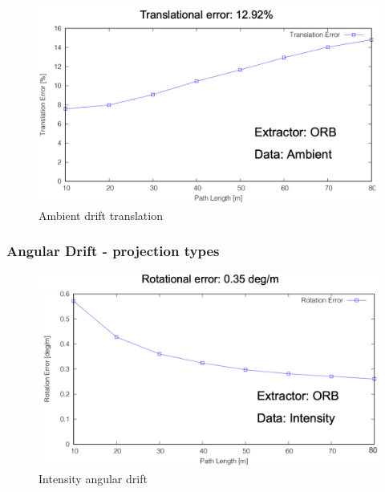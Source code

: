 {{{{            \begin{figure}[!ht]
                \centering
                \includegraphics[scale = 0.45]{images/comparison_appendix/ambient_drift_translation.png}
                \caption{Ambient drift translation}
                \label{fig:ambient_drift_transl}
            \end{figure}

        }
        \clearpage
        \subsubsection{Angular Drift - projection types}{
            \begin{figure}[!ht]
                \centering
                \includegraphics[scale = 0.43]{images/comparison_appendix/orb_drift_angle.png}
                \caption{Intensity angular drift}
                \label{fig:intensity_drift_angle}
            \end{figure}

}}}}
